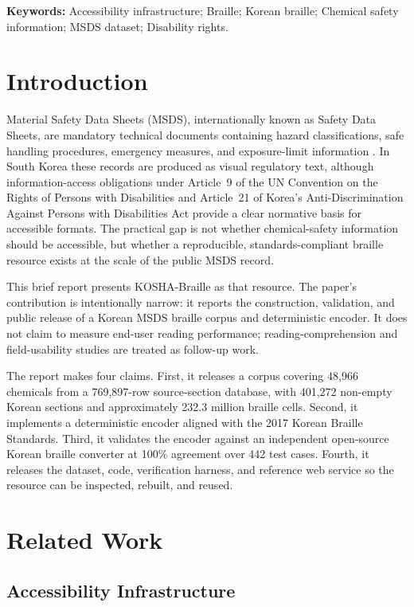 \documentclass[smallextended]{svjour3}
\begin{document}
\noindent\textbf{Keywords:} Accessibility infrastructure; Braille; Korean braille; Chemical safety information; MSDS dataset; Disability rights.

\section{Introduction}
\label{sec:introduction}

Material Safety Data Sheets (MSDS), internationally known as Safety Data Sheets, are mandatory technical documents containing hazard classifications, safe handling procedures, emergency measures, and exposure-limit information \cite{kosha_act}. In South Korea these records are produced as visual regulatory text, although information-access obligations under Article~9 of the UN Convention on the Rights of Persons with Disabilities \cite{crpd} and Article~21 of Korea's Anti-Discrimination Against Persons with Disabilities Act \cite{kdpa} provide a clear normative basis for accessible formats. The practical gap is not whether chemical-safety information should be accessible, but whether a reproducible, standards-compliant braille resource exists at the scale of the public MSDS record.

This brief report presents KOSHA-Braille as that resource. The paper's contribution is intentionally narrow: it reports the construction, validation, and public release of a Korean MSDS braille corpus and deterministic encoder. It does not claim to measure end-user reading performance; reading-comprehension and field-usability studies are treated as follow-up work.

The report makes four claims. First, it releases a corpus covering 48{,}966 chemicals from a 769{,}897-row source-section database, with 401{,}272 non-empty Korean sections and approximately 232.3 million braille cells. Second, it implements a deterministic encoder aligned with the 2017 Korean Braille Standards. Third, it validates the encoder against an independent open-source Korean braille converter at 100\% agreement over 442 test cases. Fourth, it releases the dataset, code, verification harness, and reference web service so the resource can be inspected, rebuilt, and reused.

\section{Related Work}
\label{sec:related}

\subsection{Accessibility Infrastructure}
\end{document}
